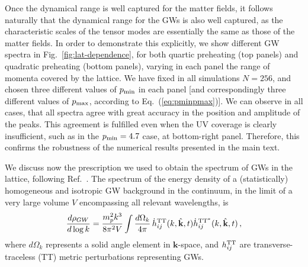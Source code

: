 \documentclass[a4paper,11pt]{article}
\newcommand{\bk}{{\mathbf k}}
\begin{document}
Once the dynamical range is well captured for the matter fields, it follows naturally that the dynamical range for the GWs is also well captured, as the characteristic scales of the tensor modes are essentially the same as those of the matter fields. In order to demonstrate this explicitly, we show different GW spectra in Fig.~\ref{fig:lat-dependence}, for both quartic preheating (top panels) and quadratic preheating (bottom panels), varying in each panel the range of momenta covered by the lattice. We have fixed in all simulations $N=256$, and chosen three different values of $p_{\rm min}$ in each panel [and correspondingly three different values of $p_{\rm max}$, according to Eq.~(\ref{eq:pminpmax})]. We can observe in all cases, that all spectra agree with great accuracy in the position and amplitude of the peaks. This agreement is fulfilled even when the UV coverage is clearly insufficient, such as in the $p_{\rm min}=4.7$ case, at bottom-right panel. Therefore, this confirms the robustness of the numerical results presented in the main text.

We discuss now the prescription we used to obtain the spectrum of GWs in the lattice, following Ref.~\cite{Figueroa:2011ye}. The spectrum of the energy density of a (statistically) homogeneous and isotropic GW background in the continuum, in the limit of a very large volume $V$ encompassing all relevant wavelengths, is
\begin{eqnarray}\label{eq:GWrhoContSpectrum}
\frac{d\rho_{GW}}{d\log k} = \frac{m_p^2k^3}{8\pi^2 V} \int {d\Omega_k\over 4\pi}\,\dot h_{ij}^{\rm TT}(k,\hat\bk,t)\dot h_{ij}^{\rm TT^*}(k,\hat\bk,t)\,,%
\end{eqnarray}
where $d\Omega_k$ represents a solid angle element in $\bk$-space, and $h_{ij}^{\rm TT}$ are transverse-traceless (TT) metric perturbations representing GWs.
\end{document}
